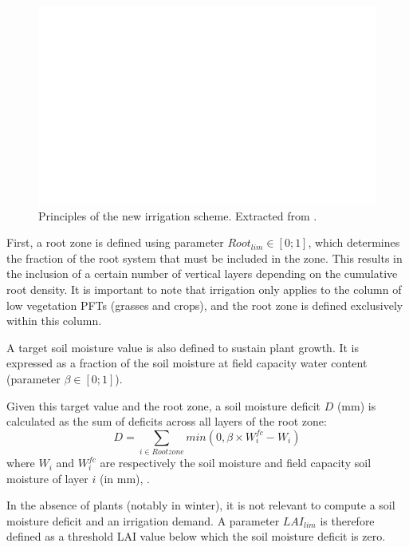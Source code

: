 \begin{figure}[t]
    \centering
    \includegraphics[width=1\textwidth]{images/schema_pedro.png}
    \caption{Principles of the new irrigation scheme. Extracted from \cite{arboleda-obando_validation_2024}.}
    \label{fig:schema_pedro}
\end{figure}

\hfill

First, a root zone is defined using parameter $Root_{lim} \in [0;1]$, which determines the fraction of the root system that must be included in the zone. This results in the inclusion of a certain number of vertical layers depending on the cumulative root density. It is important to note that irrigation only applies to the column of low vegetation PFTs (grasses and crops), and the root zone is defined exclusively within this column.

A target soil moisture value is also defined to sustain plant growth. It is expressed as a fraction of the soil moisture at field capacity water content (parameter $\beta \in [0;1]$).

Given this target value and the root zone, a soil moisture deficit $D$ (mm) is calculated as the sum of deficits across all layers of the root zone:
\begin{equation}
    D = \sum_{i \in Rootzone} min(0,\beta \times W_i^{fc} - W_i)
\end{equation}
where $W_i$ and $W_i^{fc}$ are respectively the soil moisture and field capacity soil moisture of layer $i$ (in mm), .

In the absence of plants (notably in winter), it is not relevant to compute a soil moisture deficit and an irrigation demand. A parameter $LAI_{lim}$ is therefore defined as a threshold LAI value below which the soil moisture deficit is zero.

